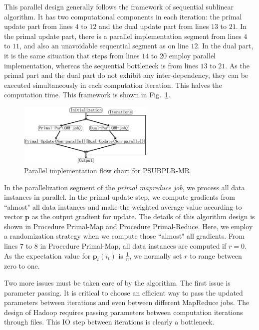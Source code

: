 \documentclass[10pt, conference, compsocconf]{IEEEtran}
\newcommand{\bp}{\mathbf{p}}
\begin{document}
This parallel design generally follows the framework of sequential sublinear algorithm.
It has two computational components in each iteration: the primal update part from lines $4$ to $12$ and the dual update part from lines $13$ to $21$.
In the primal update part, there is a parallel implementation segment from lines $4$ to $11$, and also an unavoidable sequential segment as on line $12$.
In the dual part, it is the same situation that steps from lines $14$ to 20 employ parallel implementation, whereas the sequential bottleneck is from lines $13$ to $21$.
As the primal part and the dual part do not exhibit any inter-dependency, they can be executed simultaneously in each computation iteration.  This halves the computation time.
This framework is shown in Fig.~\ref{fig:frame}.
%
\begin{figure}[tb]
\center \includegraphics[height=3.0cm,width=6.5cm]{img/framework.png}\vspace{-0.3cm}
\caption{Parallel implementation flow chart for PSUBPLR-MR}\label{fig:frame}\vspace{-0.5cm}
\end{figure}
%

In the parallelization segment of the \textit{primal mapreduce job}, we process all data instances in parallel.
In the primal update step, we compute gradients from ``almost" all data instances and make the weighted average value according to vector $\bp$ as the output gradient for update.
The details of this algorithm design is shown in Procedure Primal-Map and Procedure Primal-Reduce.
Here, we employ a randomization strategy when we compute those ``almost" all gradients.
From lines $7$ to $8$ in Procedure Primal-Map, all data instances are computed if $r=0$.
As the expectation value for $\bp_t(i_t)$ is $\frac{1}{n}$, we normally set $r$ to range between zero to one.

Two more issues must be taken care of by the algorithm.
The first issue is parameter passing. It is critical to choose an efficient way to pass the updated parameters between iterations and even between different MapReduce jobs. The design of Hadoop requires passing parameters between computation iterations through files.  This IO step between iterations is clearly a bottleneck.
\end{document}
